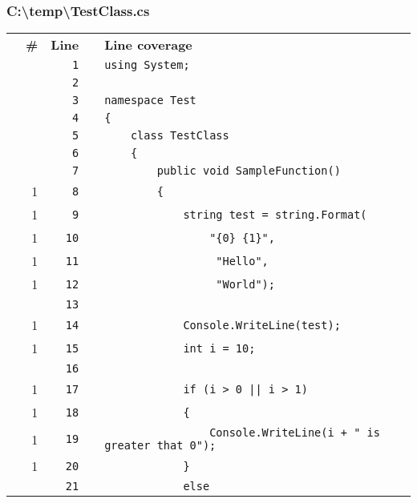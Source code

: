 \documentclass[a4paper,landscape,10pt]{article}
\begin{document}
\subsubsection{C:\textbackslash temp\textbackslash TestClass.cs}
\begin{longtable}[l]{lrrll}
\textbf{} & \textbf{\#} & \textbf{Line} & \textbf{} & \textbf{Line coverage}\\
\cellcolor{gray} &  & \verb~1~ & & \verb~using System;~\\
\cellcolor{gray} &  & \verb~2~ & & \verb~~\\
\cellcolor{gray} &  & \verb~3~ & & \verb~namespace Test~\\
\cellcolor{gray} &  & \verb~4~ & & \verb~{~\\
\cellcolor{gray} &  & \verb~5~ & & \verb~    class TestClass~\\
\cellcolor{gray} &  & \verb~6~ & & \verb~    {~\\
\cellcolor{gray} &  & \verb~7~ & & \verb~        public void SampleFunction()~\\
\cellcolor{green} & 1 & \verb~8~ & & \verb~        {~\\
\cellcolor{green} & 1 & \verb~9~ & & \verb~            string test = string.Format(~\\
\cellcolor{green} & 1 & \verb~10~ & & \verb~                "{0} {1}",~\\
\cellcolor{green} & 1 & \verb~11~ & & \verb~                 "Hello",~\\
\cellcolor{green} & 1 & \verb~12~ & & \verb~                 "World");~\\
\cellcolor{gray} &  & \verb~13~ & & \verb~~\\
\cellcolor{green} & 1 & \verb~14~ & & \verb~            Console.WriteLine(test);~\\
\cellcolor{green} & 1 & \verb~15~ & & \verb~            int i = 10;~\\
\cellcolor{gray} &  & \verb~16~ & & \verb~~\\
\cellcolor{orange} & 1 & \verb~17~ & & \verb~            if (i > 0 || i > 1)~\\
\cellcolor{green} & 1 & \verb~18~ & & \verb~            {~\\
\cellcolor{green} & 1 & \verb~19~ & & \verb~                Console.WriteLine(i + " is greater that 0");~\\
\cellcolor{green} & 1 & \verb~20~ & & \verb~            }~\\
\cellcolor{gray} &  & \verb~21~ & & \verb~            else~\\

\end{longtable}
\end{document}
